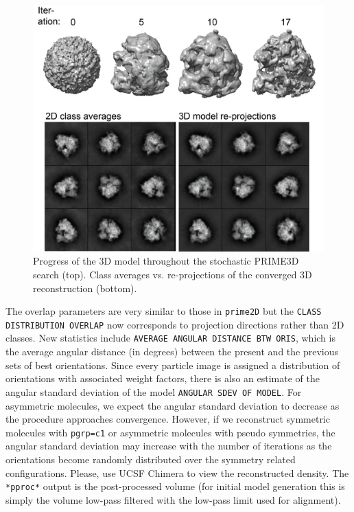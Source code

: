 \documentclass[a4paper,11pt]{article}
\newcommand{\prgname}[1]{\textcolor{NavyBlue}{\texttt{#1}}}
\begin{document}
\begin{figure}[H]
\includegraphics[keepaspectratio=true,scale=0.6]{./Pfrib3D/Pfrib3D}
\caption{Progress of the 3D model throughout the stochastic PRIME3D search (top). Class averages vs. re-projections of the converged 3D reconstruction (bottom).}
\end{figure}
The overlap parameters are very similar to those in \prgname{prime2D} but the \texttt{CLASS DISTRIBUTION OVERLAP} now corresponds to projection directions rather than 2D classes. New statistics include \texttt{AVERAGE ANGULAR DISTANCE BTW ORIS}, which is the average angular distance (in degrees) between the present and the previous sets of best orientations. Since every particle image is assigned a distribution of orientations with associated weight factors, there is also an estimate of the angular standard deviation of the model \texttt{ANGULAR SDEV OF MODEL}. For asymmetric molecules, we expect the angular standard deviation to decrease as the procedure approaches convergence. However, if we reconstruct symmetric molecules with \texttt{pgrp=c1} or asymmetric molecules with pseudo symmetries, the angular standard deviation may increase with the number of iterations as the orientations become randomly  distributed over the symmetry related configurations. Please, use UCSF Chimera to view the reconstructed density. The \texttt{*pproc*} output is the post-processed volume (for initial model generation this is simply the volume low-pass filtered with the low-pass limit used for alignment).
\end{document}
